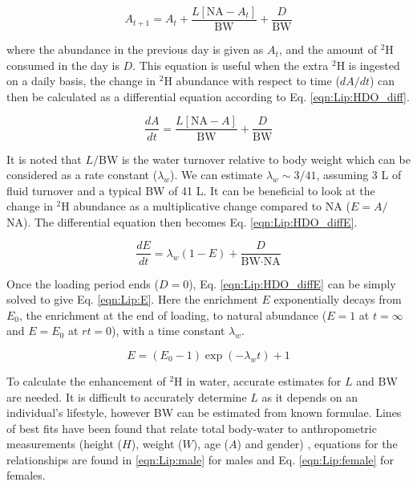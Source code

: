 \begin{equation}
    A_{t+1} = A_t + \frac{L[\textrm{NA} - A_t]}{\textrm{BW}} + \frac{D}{\textrm{BW}}
    \label{eqn:Lip:HDO}
\end{equation}

\noindent where the abundance in the previous day is given as $A_t$, and the amount of $^2$H consumed in the day is $D$. This equation is useful when the extra $^2$H is ingested on a daily basis, the change in $^2$H abundance with respect to time ($dA/dt$) can then be calculated as a differential equation according to Eq. \ref{eqn:Lip:HDO_diff}.

\begin{equation}
    \frac{dA}{dt} = \frac{L[\textrm{NA} - A]}{\textrm{BW}} + \frac{D}{\textrm{BW}}
    \label{eqn:Lip:HDO_diff}
\end{equation}

\noindent It is noted that $L/$BW is the water turnover  relative to body weight which can be considered as a rate constant ($\lambda_w$). We can estimate $\lambda_w\sim 3/41$, assuming 3 L of fluid turnover and a typical BW of 41 L. It can be beneficial to look at the change in $^2$H abundance as a multiplicative change compared to NA ($E=A/$NA). The differential equation then becomes Eq. \ref{eqn:Lip:HDO_diffE}.

\begin{equation}
    \frac{dE}{dt} = \lambda_w(1-E) + \frac{D}{\textrm{BW} \cdot \textrm{NA}}
    \label{eqn:Lip:HDO_diffE}
\end{equation}

\noindent Once the loading period ends ($D=0$), Eq. \ref{eqn:Lip:HDO_diffE} can be simply solved to give Eq. \ref{eqn:Lip:E}. Here the enrichment $E$ exponentially decays from $E_0$, the enrichment at the end of loading, to natural abundance ($E=1$ at $t=\infty$ and $E=E_0$ at $rt=0$), with a time constant $\lambda_w$.

\begin{equation}
    E = (E_0 - 1)\exp(-\lambda_wt) + 1
    \label{eqn:Lip:E}
\end{equation}

\noindent To calculate the enhancement of $^2$H in water, accurate estimates for $L$ and BW are needed. It is difficult to accurately determine $L$ as it depends on an individual's lifestyle, however BW can be estimated from known formulae. Lines of best fits have been found that relate total body-water to anthropometric measurements (height ($H$), weight ($W$), age ($A$) and gender) \cite{Watson1980TotalMeasurements}, equations for the relationships are found in \ref{eqn:Lip:male} for males and Eq. \ref{eqn:Lip:female} for females.

